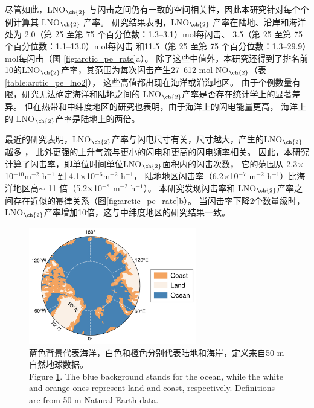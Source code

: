 尽管如此，LNO$_{\ch{2}}$ 与闪击之间仍有一致的空间相关性，因此本研究针对每个个例计算其 LNO$_{\ch{2}}$ 产率。
研究结果表明，LNO$_{\ch{2}}$ 产率在陆地、沿岸和海洋处为 2.0（第 25 至第 75 个百分位数：1.3--3.1）mol每闪击、
3.5（第 25 至第 75 个百分位数：1.1--13.0）mol每闪击
和11.5（第 25 至第 75 个百分位数：1.3--29.9）mol每闪击（图 \ref{fig:arctic_pe_rate}a）。
除了这些中值外，本研究还得到了排名前10的LNO$_{\ch{2}}$产率，其范围为每次闪击产生27--612 mol NO$_{\ch{2}}$（表\ref{table:arctic_pe_lno2}），
这些高值都出现在海洋或沿海地区。
由于个例数量有限，研究无法确定海洋和陆地之间的 LNO$_{\ch{2}}$产率是否存在统计学上的显著差异。
但在热带和中纬度地区的研究也表明，由于海洋上的闪电能量更高\citep{Beirle.2014,Hutchins.2013}，
海洋上的 LNO$_{\ch{2}}$产率是陆地上的两倍\citep{Marais.2018,Allen.2019,Bucsela.2019}。

最近的研究表明，LNO$_{\ch{2}}$产率与闪电尺寸有关，尺寸越大，产生的LNO$_{\ch{2}}$越多 \citep{Huntrieser.2008,Marais.2018}，
此外更强的上升气流与更小的闪电和更高的闪电频率相关\citep{Bruning.2013,Bruning.2015,Mecikalski.2015}。
因此，本研究计算了闪击率，即单位时间单位LNO$_{\ch{2}}$面积内的闪击次数，
它的范围从 2.3$\times$10$^{-10} $m$^{-2}$ h$^{-1}$ 到 4.1$\times$10$^{-6} $m$^{-2 }$ h$^{-1}$，
陆地地区闪击率（6.2$\times$10$^{-7}$ m$^{-2}$ h$^{-1}$）比海洋地区高$\sim$ 11 倍（5.2$\times$10$^{-8}$ m$^{-2}$ h$^{-1}$）。
本研究发现闪击率和 LNO$_{\ch{2}}$产率之间存在近似的幂律关系（图\ref{fig:arctic_pe_rate}b）。
当闪击率下降2个数量级时，LNO$_{\ch{2}}$产率增加10倍，这与中纬度地区的研究结果一致\citep{Bucsela.2019,Zhang.2020b}。

\begin{figure}[H]
\centering
\includegraphics[width=0.65\textwidth]{./figures/arctic_region_mask.png}
\caption{
蓝色背景代表海洋，白色和橙色分别代表陆地和海岸，定义来自50 m自然地球数据。 \\
Figure \ref{fig:arctic_region_mask}. The blue background stands for the ocean, while the white and orange ones represent land
and coast, respectively. Definitions are from 50 m Natural Earth data.
}
\label{fig:arctic_region_mask}
\end{figure}


